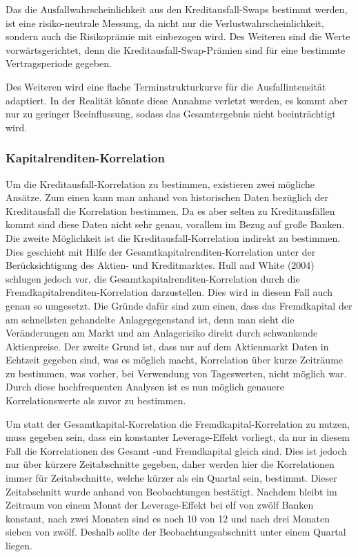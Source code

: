 \documentclass[a4paper,12pt]{scrartcl}
\begin{document}
Das die Ausfallwahrscheinlichkeit aus den Kreditausfall-Swaps bestimmt werden, ist eine risiko-neutrale Messung, da nicht nur die Verlustwahrscheinlichkeit, sondern auch die Risikoprämie mit einbezogen wird. Des Weiteren sind die Werte vorwärtsgerichtet, denn die Kreditausfall-Swap-Prämien sind für eine bestimmte Vertragsperiode gegeben. 

Des Weiteren wird eine flache Terminstrukturkurve für die Ausfallintensität adaptiert. In der Realität könnte diese Annahme verletzt werden, es kommt aber nur zu geringer Beeinflussung, sodass das Gesamtergebnis nicht beeinträchtigt wird.
\newpage
\subsubsection{Kapitalrenditen-Korrelation}
Um die Kreditausfall-Korrelation zu bestimmen, existieren zwei mögliche Ansätze.
Zum einen kann man anhand von historischen Daten bezüglich der Kreditausfall die Korrelation bestimmen. Da es aber selten zu Kreditausfällen kommt sind diese Daten nicht sehr genau, vorallem im Bezug auf große Banken.
Die zweite Möglichkeit ist die Kreditausfall-Korrelation indirekt zu bestimmen. Dies geschieht mit Hilfe der Gesamtkapitalrenditen-Korrelation unter der Berücksichtigung des Aktien- und Kreditmarktes. Hull and White (2004) schlugen jedoch vor, die Gesamtkapitalrenditen-Korrelation durch die Fremdkapitalrenditen-Korrelation darzustellen. Dies wird in diesem Fall auch genau so umgesetzt. Die Gründe dafür sind zum einen, dass das Fremdkapital der am schnellsten gehandelte Anlagegegenstand ist, denn man sieht die Veränderungen am Markt und am Anlagerisiko direkt durch schwankende Aktienpreise. Der zweite Grund ist, dass nur auf dem Aktienmarkt Daten in Echtzeit gegeben sind, was es möglich macht, Korrelation über kurze Zeiträume zu bestimmen, was vorher, bei Verwendung von Tageswerten, nicht möglich war.
Durch diese hochfrequenten Analysen ist es nun möglich genauere Korrelationswerte als zuvor zu bestimmen.

Um statt der Gesamtkapital-Korrelation die Fremdkapital-Korrelation zu nutzen, muss gegeben sein, dass ein konstanter Leverage-Effekt vorliegt, da nur in diesem Fall die Korrelationen des Gesamt -und Fremdkapital gleich sind. Dies ist jedoch nur über kürzere Zeitabschnitte gegeben, daher werden hier die Korrelationen immer für Zeitabschnitte, welche kürzer als ein Quartal sein, bestimmt. Dieser Zeitabschnitt wurde anhand von Beobachtungen bestätigt. Nachdem bleibt im Zeitraum von einem Monat der Leverage-Effekt bei elf von zwölf Banken konstant, nach zwei Monaten sind es noch 10 von 12 und nach drei Monaten sieben von zwölf. Deshalb sollte der Beobachtungsabschnitt unter einem Quartal liegen.
\end{document}
